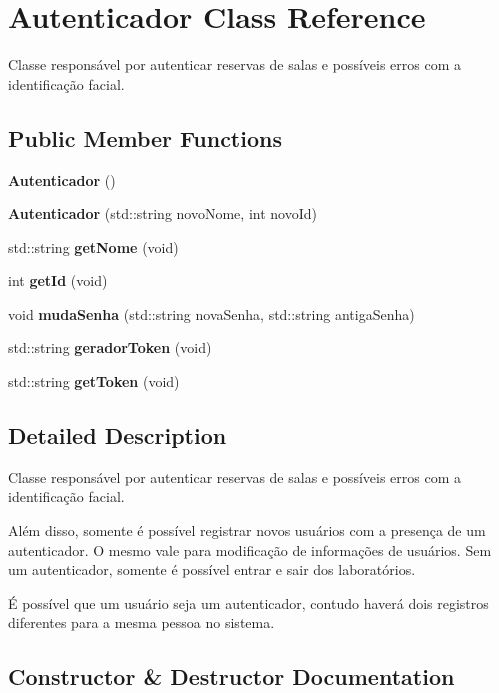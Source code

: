 \section{Autenticador Class Reference}
\label{class_autenticador}


Classe responsável por autenticar reservas de salas e possíveis erros com a identificação facial.  


\subsection*{Public Member Functions}
\begin{DoxyCompactItemize}
\item 
\textbf{ Autenticador} ()
\item 
\textbf{ Autenticador} (std\+::string novo\+Nome, int novo\+Id)
\item 
std\+::string \textbf{ get\+Nome} (void)
\item 
int \textbf{ get\+Id} (void)
\item 
void \textbf{ muda\+Senha} (std\+::string nova\+Senha, std\+::string antiga\+Senha)
\item 
std\+::string \textbf{ gerador\+Token} (void)
\item 
std\+::string \textbf{ get\+Token} (void)
\end{DoxyCompactItemize}


\subsection{Detailed Description}
Classe responsável por autenticar reservas de salas e possíveis erros com a identificação facial. 

Além disso, somente é possível registrar novos usuários com a presença de um autenticador. O mesmo vale para modificação de informações de usuários. Sem um autenticador, somente é possível entrar e sair dos laboratórios.

É possível que um usuário seja um autenticador, contudo haverá dois registros diferentes para a mesma pessoa no sistema. 

\subsection{Constructor \& Destructor Documentation}
\mbox{\label{class_autenticador_a3596badc05fd474dc357432162e9222e}} 

